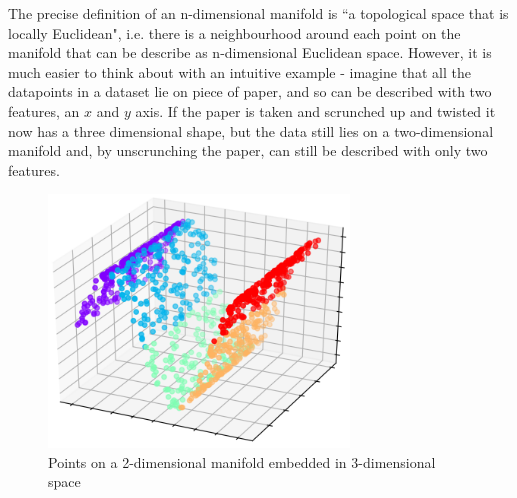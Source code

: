 \documentclass[12pt,a4paper,twoside,openright]{report}
\begin{document}
The precise definition of an n-dimensional manifold is ``a 
topological space that is locally Euclidean", i.e. there is a neighbourhood around each point on the manifold that can be describe as n-dimensional 
Euclidean space. However, it is much easier to think about with an intuitive example - imagine that all the datapoints in a 
dataset lie on piece of paper, and so can be described with two features, an $x$ and $y$ axis. If the paper is taken and scrunched up and 
twisted it now has a three dimensional shape, but the data still lies on a two-dimensional manifold and, by unscrunching the paper, can still 
be described with only two features.
\begin{figure}[H]
  \centering
  \includegraphics[width=8cm]{figs/manifold.png}
  \caption{Points on a 2-dimensional manifold embedded in 3-dimensional space}
  \label{fig:manifold}
\end{figure}
\end{document}
